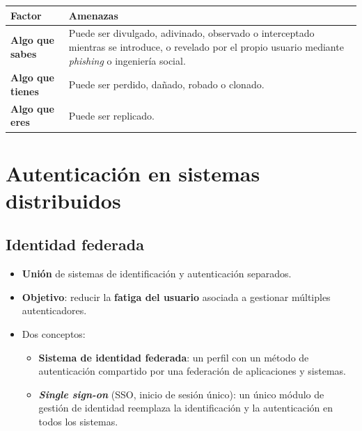 \documentclass[11pt,a4paper]{report}
\begin{document}
\begin{center}
\small
{\setlength{\aboverulesep}{0pt}\setlength{\belowrulesep}{0pt}\renewcommand{\arraystretch}{1.3}%
\begin{tabularx}{\linewidth}{>{\raggedright\arraybackslash}p{3.2cm} !{\color{gray!45}\vrule width 0.2pt} >{\raggedright\arraybackslash}X}
\toprule
\textbf{Factor} & \textbf{Amenazas} \\
\midrule
\textbf{Algo que sabes} & Puede ser divulgado, adivinado, observado o interceptado mientras se introduce, o revelado por el propio usuario mediante \emph{phishing} o ingeniería social. \\
\textbf{Algo que tienes} & Puede ser perdido, dañado, robado o clonado. \\
\textbf{Algo que eres} & Puede ser replicado. \\
\bottomrule
\end{tabularx}}
\end{center}
 
\chapter{Autenticación en sistemas distribuidos}
 
\section{Identidad federada}
 
\begin{itemize}
  \item \textbf{Unión} de sistemas de identificación y autenticación separados.
  \item \textbf{Objetivo}: reducir la \textbf{fatiga del usuario} asociada a gestionar múltiples autenticadores.
  \item Dos conceptos:
    \begin{itemize}
      \item \textbf{Sistema de identidad federada}: un perfil con un método de autenticación compartido por una federación de aplicaciones y sistemas.
      \item \textbf{\emph{Single sign-on}} (SSO, inicio de sesión único): un único módulo de gestión de identidad reemplaza la identificación y la autenticación en todos los sistemas.
    \end{itemize}
\end{itemize}
 
\end{document}
